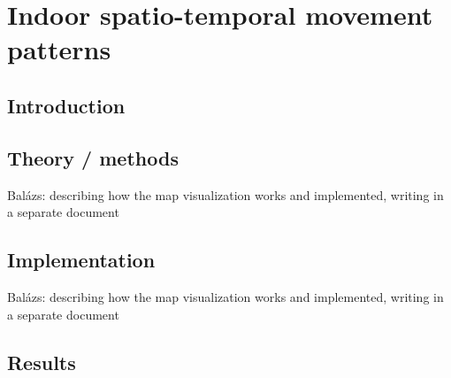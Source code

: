 \chapter{Indoor spatio-temporal movement patterns}
\section{Introduction}
\section{Theory / methods}
Balázs: describing how the map visualization works and implemented, writing in 
a separate document
\section{Implementation}
Balázs: describing how the map visualization works and implemented, writing in 
a separate document
\section{Results}

